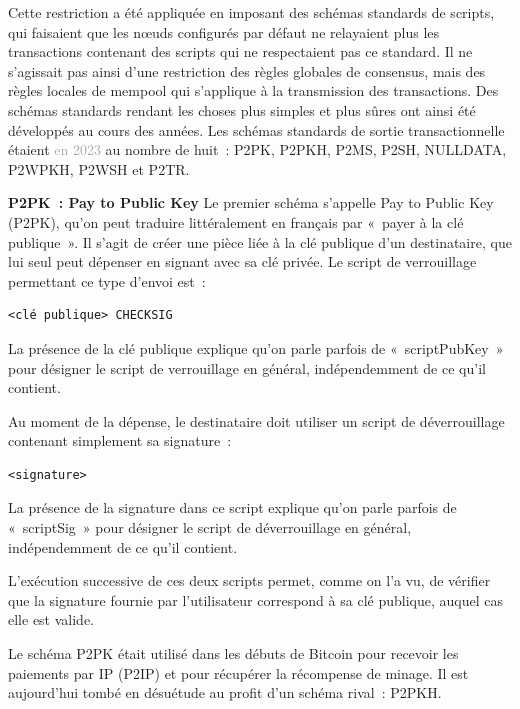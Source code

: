Cette restriction a été appliquée en imposant des schémas standards de scripts, qui faisaient que les nœuds configurés par défaut ne relayaient plus les transactions contenant des scripts qui ne respectaient pas ce standard. Il ne s'agissait pas ainsi d'une restriction des règles globales de consensus, mais des règles locales de mempool qui s'applique à la transmission des transactions. Des schémas standards rendant les choses plus simples et plus sûres ont ainsi été développés au cours des années. Les schémas standards de sortie transactionnelle étaient \textcolor{darkgray}{en 2023} au nombre de huit~: P2PK, P2PKH, P2MS, P2SH, NULLDATA, P2WPKH, P2WSH et P2TR.


\textbf{P2PK~: Pay to Public Key} Le premier schéma s'appelle Pay to Public Key (P2PK), qu'on peut traduire littéralement en français par «~payer à la clé publique~». Il s'agit de créer une pièce liée à la clé publique d'un destinataire, que lui seul peut dépenser en signant avec sa clé privée. Le script de verrouillage permettant ce type d'envoi est~:

\begin{Verbatim}[fontsize=\small]
<clé publique> CHECKSIG
\end{Verbatim}

La présence de la clé publique explique qu'on parle parfois de «~scriptPubKey~» pour désigner le script de verrouillage en général, indépendemment de ce qu'il contient.

Au moment de la dépense, le destinataire doit utiliser un script de déverrouillage contenant simplement sa signature~:

\begin{Verbatim}[fontsize=\small]
<signature>
\end{Verbatim}

La présence de la signature dans ce script explique qu'on parle parfois de «~scriptSig~» pour désigner le script de déverrouillage en général, indépendemment de ce qu'il contient.

L'exécution successive de ces deux scripts permet, comme on l'a vu, de vérifier que la signature fournie par l'utilisateur correspond à sa clé publique, auquel cas elle est valide.

Le schéma P2PK était utilisé dans les débuts de Bitcoin pour recevoir les paiements par IP (P2IP) et pour récupérer la récompense de minage. Il est aujourd'hui tombé en désuétude au profit d'un schéma rival~: P2PKH.

